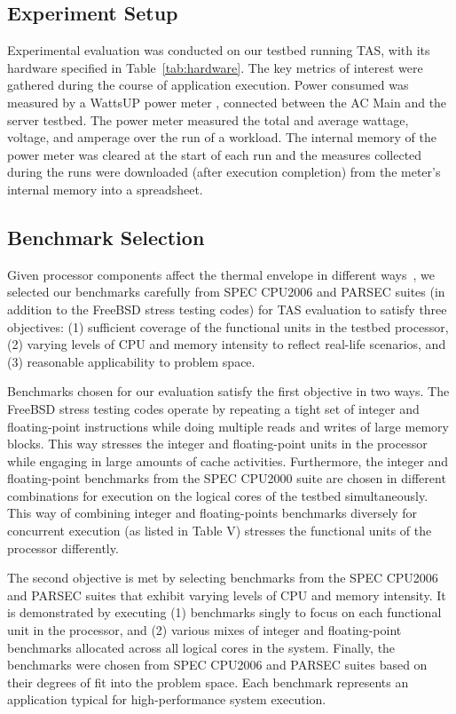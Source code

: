 \documentclass[times, 10pt,twocolumn]{IEEEtran}
\begin{document}
\subsection{Experiment Setup}
\label{sec:experiment-setup} 
Experimental evaluation was conducted on our testbed running TAS, with
its hardware specified in Table~\ref{tab:hardware}.  The key metrics of
interest were gathered during the course of application execution.
Power consumed was measured by a WattsUP power meter
\cite{WattsUp2006a}, connected between the AC Main and the server
testbed.  The power meter measured the total and average wattage,
voltage, and amperage over the run of a workload.  The internal memory
of the power meter was cleared at the start of each run and the measures
collected during the runs were downloaded (after execution completion)
from the meter's internal memory into a spreadsheet.

\subsection{Benchmark Selection}
\label{sec:experimental-setup-1} 
Given processor components affect the thermal envelope in different
ways~\cite{Kumar2008}, we selected our benchmarks carefully from SPEC
CPU2006 and PARSEC suites (in addition to the FreeBSD stress testing
codes) for TAS evaluation to satisfy three objectives: (1) sufficient
coverage of the functional units in the testbed processor, (2) varying
levels of CPU and memory intensity to reflect real-life scenarios, and
(3) reasonable applicability to problem space.

Benchmarks chosen for our evaluation satisfy the first objective in two
ways.  The FreeBSD stress testing codes operate by repeating a tight set
of integer and floating-point instructions while doing multiple reads
and writes of large memory blocks.  This way stresses the integer and
floating-point units in the processor while engaging in large amounts of
cache activities.  Furthermore, the integer and floating-point
benchmarks from the SPEC CPU2000 suite are chosen in different
combinations for execution on the logical cores of the testbed
simultaneously.  This way of combining integer and floating-points
benchmarks diversely for concurrent execution (as listed in Table V)
stresses the functional units of the processor differently.

The second objective is met by selecting benchmarks from the SPEC
CPU2006 and PARSEC suites that exhibit varying levels of CPU and memory
intensity.  It is demonstrated by executing (1) benchmarks singly to
focus on each functional unit in the processor, and (2) various mixes of
integer and floating-point benchmarks allocated across all logical cores
in the system.  Finally, the benchmarks were chosen from SPEC CPU2006
and PARSEC suites based on their degrees of fit into the problem space.
Each benchmark represents an application typical for high-performance system execution.
\end{document}
